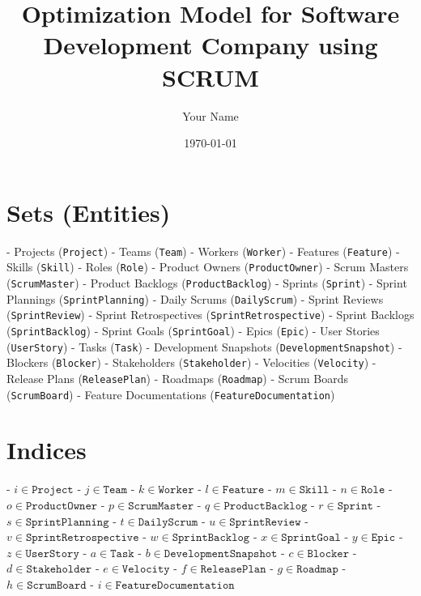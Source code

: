 \documentclass{article}
\title{Optimization Model for Software Development Company using SCRUM}
\author{Your Name}
\date{\today}
\begin{document}
\maketitle

\tableofcontents

\section{Sets (Entities)}
- Projects (\texttt{Project})
- Teams (\texttt{Team})
- Workers (\texttt{Worker})
- Features (\texttt{Feature})
- Skills (\texttt{Skill})
- Roles (\texttt{Role})
- Product Owners (\texttt{ProductOwner})
- Scrum Masters (\texttt{ScrumMaster})
- Product Backlogs (\texttt{ProductBacklog})
- Sprints (\texttt{Sprint})
- Sprint Plannings (\texttt{SprintPlanning})
- Daily Scrums (\texttt{DailyScrum})
- Sprint Reviews (\texttt{SprintReview})
- Sprint Retrospectives (\texttt{SprintRetrospective})
- Sprint Backlogs (\texttt{SprintBacklog})
- Sprint Goals (\texttt{SprintGoal})
- Epics (\texttt{Epic})
- User Stories (\texttt{UserStory})
- Tasks (\texttt{Task})
- Development Snapshots (\texttt{DevelopmentSnapshot})
- Blockers (\texttt{Blocker})
- Stakeholders (\texttt{Stakeholder})
- Velocities (\texttt{Velocity})
- Release Plans (\texttt{ReleasePlan})
- Roadmaps (\texttt{Roadmap})
- Scrum Boards (\texttt{ScrumBoard})
- Feature Documentations (\texttt{FeatureDocumentation})

\section{Indices}
- \( i \in \texttt{Project} \)
- \( j \in \texttt{Team} \)
- \( k \in \texttt{Worker} \)
- \( l \in \texttt{Feature} \)
- \( m \in \texttt{Skill} \)
- \( n \in \texttt{Role} \)
- \( o \in \texttt{ProductOwner} \)
- \( p \in \texttt{ScrumMaster} \)
- \( q \in \texttt{ProductBacklog} \)
- \( r \in \texttt{Sprint} \)
- \( s \in \texttt{SprintPlanning} \)
- \( t \in \texttt{DailyScrum} \)
- \( u \in \texttt{SprintReview} \)
- \( v \in \texttt{SprintRetrospective} \)
- \( w \in \texttt{SprintBacklog} \)
- \( x \in \texttt{SprintGoal} \)
- \( y \in \texttt{Epic} \)
- \( z \in \texttt{UserStory} \)
- \( a \in \texttt{Task} \)
- \( b \in \texttt{DevelopmentSnapshot} \)
- \( c \in \texttt{Blocker} \)
- \( d \in \texttt{Stakeholder} \)
- \( e \in \texttt{Velocity} \)
- \( f \in \texttt{ReleasePlan} \)
- \( g \in \texttt{Roadmap} \)
- \( h \in \texttt{ScrumBoard} \)
- \( i \in \texttt{FeatureDocumentation} \)
\end{document}
